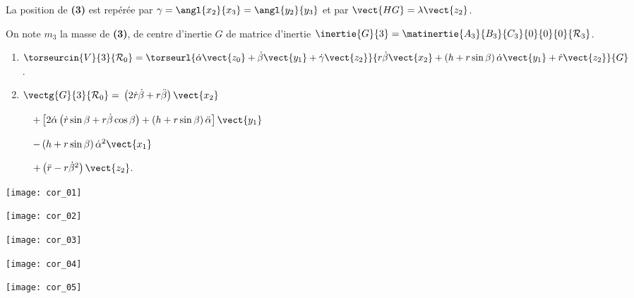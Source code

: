 La position de \textbf{(3)} est repérée par $\gamma=\angl{x_2}{x_3}=\angl{y_2}{y_3}$ et par $\vect{HG}=\lambda\vect{z_2}$. 

On note $m_3$ la masse de \textbf{(3)}, de centre d'inertie $G$ de matrice d'inertie $\inertie{G}{3}=\matinertie{A_3}{B_3}{C_3}{0}{0}{0}{\mathcal{R}_3}$.








\ifprof
\begin{enumerate}
\item $\torseurcin{V}{3}{\mathcal{R}_0}=\torseurl{\dot{\alpha}\vect{z_0}+\dot{\beta}\vect{y_1}+\dot{\gamma}\vect{z_2}}{r\dot{\beta}\vect{x_2}+\left( h+r\sin \beta \right)\dot{\alpha}\vect{y_1}+\dot{r}\vect{z_2}}{G}$.
\item $\vectg{G}{3}{\mathcal{R}_0}=$
$\left(2\dot{r}\dot{\beta}+r\ddot{\beta} \right)\vect{x_2}$

$\quad +\left[2\dot{\alpha}\left( \dot{r}\sin\beta +r\dot{\beta} \cos \beta \right) + \left(h+r\sin\beta \right)\ddot{ \alpha}\right]\vect{y_1}$

$\quad -\left(h+r\sin\beta \right)\dot{\alpha}^2\vect{x_1}$

$\quad +\left(\ddot{r}-r\dot{\beta}^2 \right)\vect{z_2}$.
\end{enumerate}
\else
\fi


\ifprof
\begin{center}
\texttt{[image: cor\_01]}
\end{center}
\begin{center}
\texttt{[image: cor\_02]}
\end{center}
\begin{center}
\texttt{[image: cor\_03]}
\end{center}
\begin{center}
\texttt{[image: cor\_04]}
\end{center}
\begin{center}
\texttt{[image: cor\_05]}
\end{center}
\else
\fi


